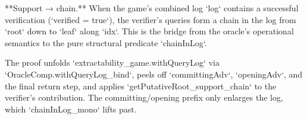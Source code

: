 
**Support → chain.** When the game's combined log `log` contains a successful
verification (`verified = true`), the verifier's queries form a chain in the log
from `root` down to `leaf` along `idx`. This is the bridge from the oracle's
operational semantics to the pure structural predicate `chainInLog`.

The proof unfolds `extractability_game.withQueryLog` via
`OracleComp.withQueryLog_bind`, peels off `committingAdv`, `openingAdv`, and the
final return step, and applies `getPutativeRoot_support_chain` to the verifier's
contribution. The committing/opening prefix only enlarges the log, which
`chainInLog_mono` lifts past.